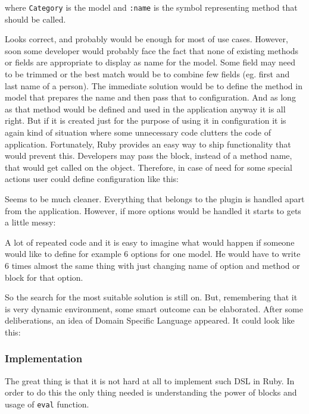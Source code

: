        
      
        where \texttt{Category} is the model and \texttt{:name} is the symbol representing method that 
        should be called. 
      
        Looks correct, and probably would be enough for most of use cases. However, soon some developer
        would probably face the fact that none of existing methods or fields are appropriate to display
        as name for the model. Some field may need to be trimmed or the best match would be to combine 
        few fields (eg. first and last name of a person). The immediate solution would be to define the 
        method in model that prepares the name and then pass that to configuration. And as long as that 
        method would be defined and used in the application anyway it is all right. But if it is created
        just for the purpose of using it in configuration it is again kind of situation where some 
        unnecessary code clutters the code of application. Fortunately, Ruby provides an easy way to
        ship functionality that would prevent this. Developers may pass the block, instead of a method name,
        that would get called on the object. Therefore, in case of need for some special actions user could
        define configuration like this:
      
        
      
        Seems to be much cleaner. Everything that belongs to the plugin is handled apart from the application.
        However, if more options would be handled it starts to gets a little messy:
      
        
      
        A lot of repeated code and it is easy to imagine what would happen if someone would like to define
        for example 6 options for one model. He would have to write 6 times almost the same thing with just
        changing name of option and method or block for that option. 
      
        So the search for the most suitable solution is still on. But, remembering that it is
        very dynamic environment, some smart outcome can be elaborated. After some deliberations,
        an idea of Domain Specific Language appeared. It could look like this:
      
        
      \subsubsection{Implementation}
        The great thing is that it is not hard at all to implement such DSL in Ruby. In order to do this
        the only thing needed is understanding the power of blocks and usage of \texttt{eval} function.
        
